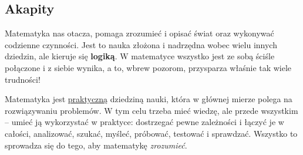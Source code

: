 \subsection{Akapity}

Matematyka nas otacza, pomaga zrozumieć i opisać świat oraz wykonywać codzienne czynności. Jest to nauka złożona i nadrzędna wobec wielu innych dziedzin, ale kieruje się \textbf{logiką}. W matematyce wszystko jest ze sobą ściśle połączone i z siebie wynika, a to, wbrew pozorom, przysparza właśnie tak wiele trudności!

Matematyka jest \underline{praktyczną} dziedziną nauki, która w głównej mierze polega na rozwiązywaniu problemów. W tym celu trzeba mieć wiedzę, ale przede wszystkim – umieć ją wykorzystać w praktyce: dostrzegać pewne zależności i łączyć je w całości, analizować, szukać, myśleć, próbować, testować i sprawdzać. Wszystko to sprowadza się do tego, aby matematykę \textit{zrozumieć}. 